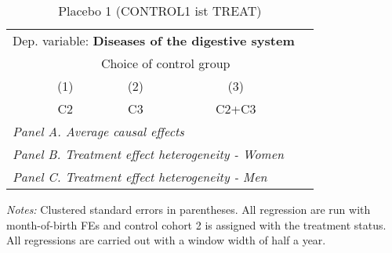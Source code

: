  \begin{table}[H] \centering \begin{threeparttable} \caption{Placebo 1 (CONTROL1 ist TREAT) } {\def\sym#1{\ifmmode^{#1}\else\(^{#1}\)\fi} \begin{tabular}{l*{4}{c}} \toprule \multicolumn{4}{l}{Dep. variable: \textbf{Diseases of the digestive system}} \\ & \multicolumn{3}{c}{Choice of control group} \\ \cmidrule(lr){2-4}
            &\multicolumn{1}{c}{(1)}&\multicolumn{1}{c}{(2)}&\multicolumn{1}{c}{(3)}\\
            &\multicolumn{1}{c}{C2}&\multicolumn{1}{c}{C3}&\multicolumn{1}{c}{C2+C3}\\
\midrule
 \multicolumn{4}{l}{\emph{Panel A. Average causal effects}} \\      \midrule\multicolumn{4}{l}{\emph{Panel B. Treatment effect heterogeneity - Women}} \\      \midrule\multicolumn{4}{l}{\emph{Panel C. Treatment effect heterogeneity - Men}} \\      
\bottomrule \end{tabular} } \begin{tablenotes} \item \scriptsize \emph{Notes:} Clustered standard errors in parentheses. All regression are run with month-of-birth FEs and control cohort 2 is assigned with the treatment status. All regressions are carried out with a window width of half a year. \end{tablenotes} \end{threeparttable} \end{table} 
